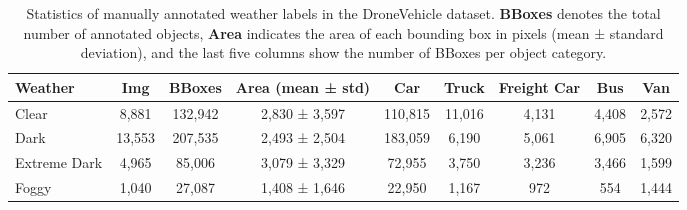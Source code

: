 \begin{table}[t]
    \centering
    \caption{Statistics of manually annotated weather labels in the DroneVehicle dataset. 
    \textbf{BBoxes} denotes the total number of annotated objects, \textbf{Area} indicates the area of each bounding box in pixels (mean ± standard deviation), 
    and the last five columns show the number of BBoxes per object category.}
    \label{tab:weather_stats}
    \begin{tabular}{l|c|c|c|c|c|c|c|c}
        \toprule
        \textbf{Weather} & \textbf{Img} & \textbf{BBoxes} & \textbf{Area (mean ± std)} & \textbf{Car} & \textbf{Truck} & \textbf{Freight Car} & \textbf{Bus} & \textbf{Van} \\
        \midrule
        Clear & 8,881 & 132,942 & 2,830 ± 3,597 & 110,815 & 11,016 & 4,131 & 4,408 & 2,572 \\
        Dark & 13,553 & 207,535 & 2,493 ± 2,504 & 183,059 & 6,190 & 5,061 & 6,905 & 6,320 \\
        Extreme Dark & 4,965 & 85,006 & 3,079 ± 3,329 & 72,955 & 3,750 & 3,236 & 3,466 & 1,599 \\
        Foggy & 1,040 & 27,087 & 1,408 ± 1,646 & 22,950 & 1,167 & 972 & 554 & 1,444 \\
        \bottomrule
    \end{tabular}
\end{table}
